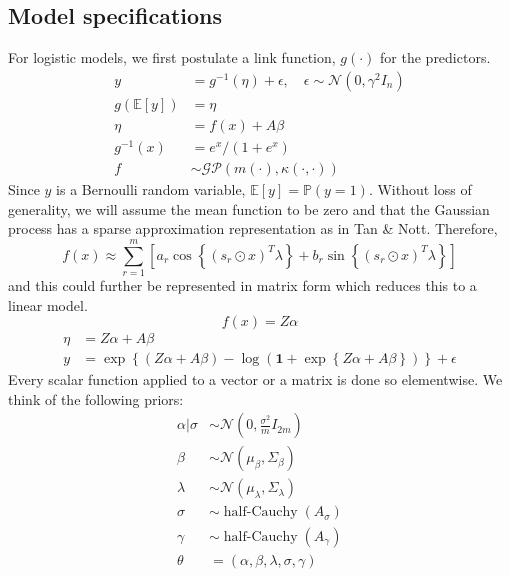 \documentclass[11pt]{article}
\newcommand{\bs}{\boldsymbol}
\newcommand{\opn}{\operatorname}
\begin{document}
\subsection{Model specifications}
For logistic models, we first postulate a link function, $g\left(\cdot \right)$ for the predictors.
\begin{align*}
  y &= g^{-1}\left(\eta\right) + \epsilon, \quad \epsilon \sim \mathcal{N}\left(0, \gamma^{2}I_{n}\right)\\
  g\left(\mathbb{E}\left[y\right]\right) &= \eta\\
  \eta &= f\left(x\right) + A\beta\\
  g^{-1}\left(x\right) &= e^{x}/\left(1+e^{x}\right)\\
  f &\sim \mathcal{GP}\left(m\left(\cdot \right), \kappa\left(\cdot, \cdot \right)\right)
\end{align*}
Since $y$ is a Bernoulli random variable, $\mathbb{E}\left[y\right] = \mathbb{P}\left(y=1\right)$. Without loss of generality, we will assume the mean function to be zero and that the Gaussian process has a sparse approximation representation as in Tan \& Nott. Therefore,
$$
  f\left(x\right) \approx \sum_{r=1}^{m}\left[a_{r}\cos \left\{\left(s_{r} \odot x\right)^{T}\lambda \right\}+b_{r}\sin \left\{\left(s_{r}\odot x\right)^{T}\lambda \right\}\right]
$$
and this could further be represented in matrix form which reduces this to a linear model.
$$
  f\left(x\right) = Z\alpha
$$
\begin{align*}
  \eta &= Z\alpha + A\beta\\
  y &= \exp\left\{\left(Z\alpha+A\beta\right) -\log \left(\bs{1}+\exp \left\{Z\alpha +A\beta \right\}\right) \right\} + \epsilon
\end{align*}
Every scalar function applied to a vector or a matrix is done so elementwise. We think of the following priors:
\begin{align*}
  \alpha|\sigma &\sim \mathcal{N}\left(0, \frac{\sigma^{2}}{m}I_{2m}\right)\\
  \beta &\sim \mathcal{N}\left(\mu_{\beta}, \Sigma_{\beta}\right) \\
  \lambda &\sim \mathcal{N}\left(\mu_{\lambda}, \Sigma_{\lambda}\right) \\
  \sigma &\sim \opn{half-Cauchy}\left(A_{\sigma}\right) \\
  \gamma &\sim \opn{half-Cauchy}\left(A_{\gamma}\right)\\
  \theta &= \left(\alpha, \beta, \lambda, \sigma, \gamma\right)
\end{align*}
\end{document}
